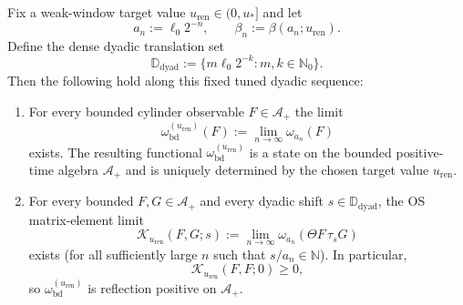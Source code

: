 \begin{theorem}
\label{thm:continuum_tightness}
Fix a weak-window target value $u_{\mathrm{ren}}\in(0,u_\ast]$ and let
\[
 a_n:=\ell_0 2^{-n},
 \qquad
 \beta_n:=\beta(a_n;u_{\mathrm{ren}}).
\]
Define the dense dyadic translation set
\[
\mathbb D_{\mathrm{dyad}}:=\{m\ell_0 2^{-k}:m,k\in\mathbb N_0\}.
\]
Then the following hold along this fixed tuned dyadic sequence:
\begin{enumerate}[label=(\roman*),leftmargin=*]
\item For every bounded cylinder observable $F\in\mathcal A_+$ the limit
\[
\omega_{\mathrm{bd}}^{(u_{\mathrm{ren}})}(F):=\lim_{n\to\infty}\omega_{a_n}(F)
\]
exists. The resulting functional $\omega_{\mathrm{bd}}^{(u_{\mathrm{ren}})}$ is a state on the bounded positive-time algebra $\mathcal A_+$ and is uniquely determined by the chosen target value $u_{\mathrm{ren}}$.
\item For every bounded $F,G\in\mathcal A_+$ and every dyadic shift $s\in\mathbb D_{\mathrm{dyad}}$, the OS matrix-element limit
\begin{equation}\label{eq:continuum_tightness_dyadic_OS_limit}
\mathcal K_{u_{\mathrm{ren}}}(F,G;s)
:=
\lim_{n\to\infty}\omega_{a_n}(\Theta F\,\tau_s G)
\end{equation}
exists (for all sufficiently large $n$ such that $s/a_n\in\mathbb N$).
In particular,
\begin{equation}\label{eq:continuum_tightness_RP}
\mathcal K_{u_{\mathrm{ren}}}(F,F;0)\ge 0,
\end{equation}
so $\omega_{\mathrm{bd}}^{(u_{\mathrm{ren}})}$ is reflection positive on $\mathcal A_+$.
\end{enumerate}
\end{theorem}

